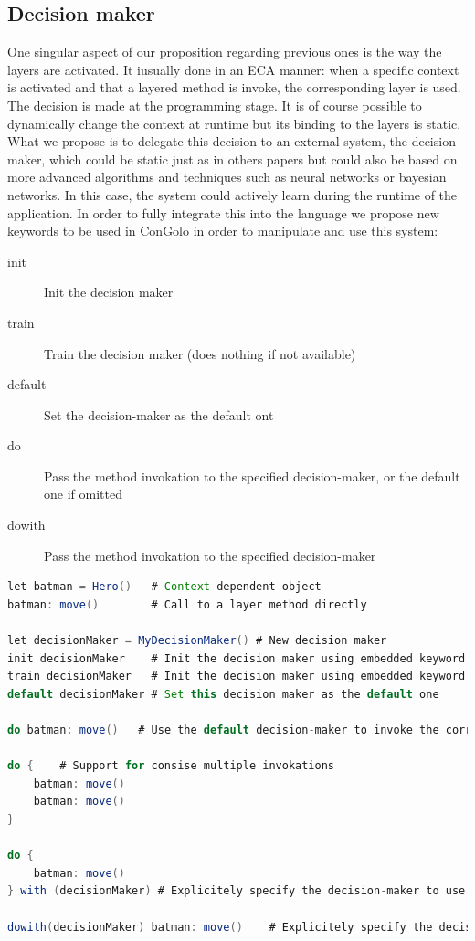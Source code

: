 \documentclass[a4paper]{article}
\begin{document}
\subsection{Decision maker}
\label{subsection:decisionmaker}

One singular aspect of our proposition regarding previous ones is the way the layers are activated. It iusually done in an ECA manner: when a specific context is activated and that a layered method is invoke, the corresponding layer is used. The decision is made at the programming stage. It is of course possible to dynamically change the context at runtime but its binding to the layers is static. What we propose is to delegate this decision to an external system, the decision-maker, which could be static just as in others papers but could also be based on more advanced algorithms and techniques such as neural networks or bayesian networks. In this case, the system could actively learn during the runtime of the application. In order to fully integrate this into the language we propose new keywords to be used in ConGolo in order to manipulate and use this system:

\begin{description}
  \item[init] Init the decision maker
  \item[train] Train the decision maker (does nothing if not available)
  \item[default] Set the decision-maker as the default ont
  \item[do] Pass the method invokation to the specified decision-maker, or the default one if omitted
  \item[dowith] Pass the method invokation to the specified decision-maker
\end{description}

\begin{lstlisting}[float, language=Java, caption=ConGolo example, label={listing:congolohero}]
let batman = Hero()   # Context-dependent object
batman: move()        # Call to a layer method directly

let decisionMaker = MyDecisionMaker() # New decision maker
init decisionMaker    # Init the decision maker using embedded keyword
train decisionMaker   # Init the decision maker using embedded keyword
default decisionMaker # Set this decision maker as the default one

do batman: move()	# Use the default decision-maker to invoke the correct method move of Hero

do {	# Support for consise multiple invokations
	batman: move()
	batman: move()
}

do {
	batman: move()
} with (decisionMaker) # Explicitely specify the decision-maker to use

dowith(decisionMaker) batman: move()	# Explicitely specify the decision-maker to use in a consise form
\end{lstlisting}
\end{document}
